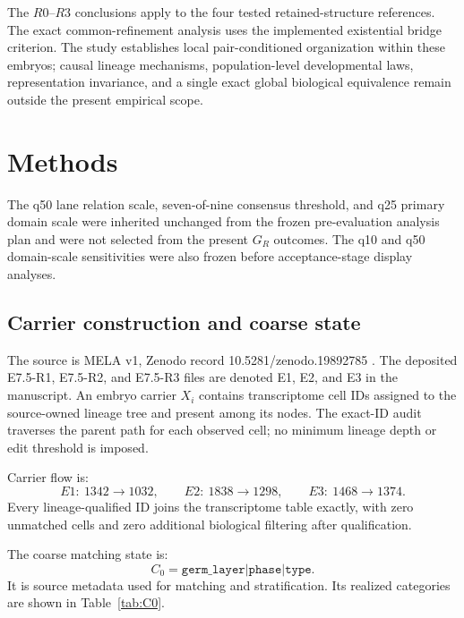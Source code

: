 \documentclass[11pt]{article}
\newcommand{\Czero}{C_0}
\begin{document}
The \(R0\)--\(R3\) conclusions apply to the four tested retained-structure references. The exact common-refinement analysis uses the implemented existential bridge criterion. The study establishes local pair-conditioned organization within these embryos; causal lineage mechanisms, population-level developmental laws, representation invariance, and a single exact global biological equivalence remain outside the present empirical scope.

\FloatBarrier
\section{Methods}

The q50 lane relation scale, seven-of-nine consensus threshold, and q25 primary domain scale were inherited unchanged from the frozen pre-evaluation analysis plan and were not selected from the present \(G_R\) outcomes. The q10 and q50 domain-scale sensitivities were also frozen before acceptance-stage display analyses.


\subsection{Carrier construction and coarse state}

The source is MELA v1, Zenodo record 10.5281/zenodo.19892785 \cite{Colgan2026}. The deposited E7.5-R1, E7.5-R2, and E7.5-R3 files are denoted E1, E2, and E3 in the manuscript. An embryo carrier \(X_i\) contains transcriptome cell IDs assigned to the source-owned lineage tree and present among its nodes. The exact-ID audit traverses the parent path for each observed cell; no minimum lineage depth or edit threshold is imposed.

Carrier flow is:
\[
E1:\ 1342\rightarrow1032,\qquad
E2:\ 1838\rightarrow1298,\qquad
E3:\ 1468\rightarrow1374.
\]
Every lineage-qualified ID joins the transcriptome table exactly, with zero unmatched cells and zero additional biological filtering after qualification.

The coarse matching state is:
\[
\Czero=
\texttt{germ\_layer|phase|type}.
\]
It is source metadata used for matching and stratification. Its realized categories are shown in Table~\ref{tab:C0}.
\end{document}
